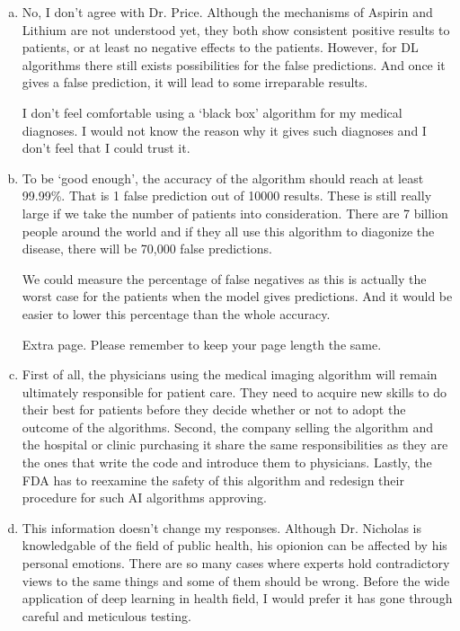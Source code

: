 \begin{enumerate}[(a)]

    \item No, I don't agree with Dr. Price. Although the mechanisms of Aspirin and Lithium are not understood yet, they both show consistent positive results to patients, or at least no negative effects to the patients. However, for DL algorithms there still exists possibilities for the false predictions. And once it gives a false prediction, it will lead to some irreparable results.

          I don't feel comfortable using a ‘black box’ algorithm for my medical diagnoses. I would not know the reason why it gives such diagnoses and I don't feel that I could trust it.

    \item To be ‘good enough’, the accuracy of the algorithm should reach at least 99.99\%. That is 1 false prediction out of 10000 results. These is still really large if we take the number of patients into consideration. There are 7 billion people around the world and if they all use this algorithm to diagonize the disease, there will be 70,000 false predictions.

          We could measure the percentage of false negatives as this is actually the worst case for the patients when the model gives predictions. And it would be easier to lower this percentage than the whole accuracy.


          \pagebreak
          Extra page. Please remember to keep your page length the same.

    \item First of all, the physicians using the medical imaging algorithm will remain ultimately responsible for patient care. They need to acquire new skills to do their best for patients before they decide whether or not to adopt the outcome of the algorithms. Second, the company selling the algorithm and the hospital or clinic purchasing it share the same responsibilities as they are the ones that write the code and introduce them to physicians. Lastly, the FDA has to reexamine the safety of this algorithm and redesign their procedure for such AI algorithms approving.

    \item This information doesn't change my responses. Although Dr. Nicholas is knowledgable of the field of public health, his opionion can be affected by his personal emotions. There are so many cases where experts hold contradictory views to the same things and some of them should be wrong. Before the wide application of deep learning in health field, I would prefer it has gone through careful and meticulous testing.
\end{enumerate}


